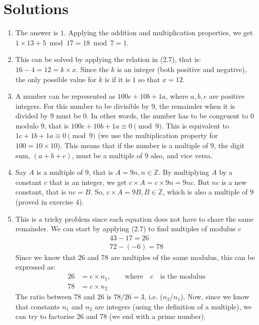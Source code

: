 \section{Solutions}
\begin{enumerate}
\item The answer is $1$. Applying the addition and multiplication properties, we get $1 \times 13 + 5 \bmod 17 = 18\bmod 7 = 1 $.
\item This can be solved by applying the relation in (2.7), that is: $16-4 = 12 = k \times x$. Since the $k$ is an integer (both positive and negative), the only possible value for $k$ is if it is $1$ so that $x=12$. 
\item A number can be represented as $100c+10b+1a$, where $a,b,c$ are positive integers. For this number to be divisible by $9$, the remainder when it is divided by $9$ must be $0$.  In other words, the number has to be congruent to $0$ modulo $9$, that is $100c+10b+1a \equiv 0 \pmod 9$. This is equivalent to $1c+1b+1a \equiv 0 \pmod 9$ (we use the multiplication property for $100=10\times 10$). This means that if the number is a multiple of $9$, the digit sum, $(a+b+c)$, must be a multiple of $9$ also, and vice versa.
\item Say $A$ is a multiple of $9$, that is $A=9n, n\in \mathbb{Z}$. By multiplying $A$ by a constant $c$ that is an integer, we get $c\times A = c\times 9n = 9nc$. But $nc$ is a new constant, that is $nc=B$. So, $c\times A = 9B, B \in \mathbb{Z}$, which is also a multiple of $9$ (proved in exercise 4).
\item This is a tricky problem since each equation does not have to share the same remainder. We can start by applying (2.7) to find multiples of modulus $c$
\begin{eqnarray*}
43-17 = 26\\
72 - (-6) = 78
\end{eqnarray*}
Since we know that $26$ and $78$ are multiples of the same modulus, this can be expressed as:
\begin{align*}
26&=c\times n_1, \qquad \text{where}\quad c\quad \text{is the modulus}\\
78&=c\times n_2
\end{align*}
The ratio between $78$ and $26$ is $78/26=3$, i.e. ($n_2/n_1$). Now, since we know that constants $n_1$ and $n_2$ are integers (using the definition of a multiple), we can try to factorise $26$ and $78$ (we end with a prime number).


\end{enumerate}

